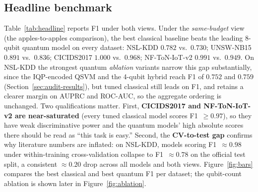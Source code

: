 \documentclass[preprint,11pt]{elsarticle}
\begin{document}
\subsection{Headline benchmark}
Table~\ref{tab:headline} reports F1 under both views. Under the \emph{same-budget} view (the
apples-to-apples comparison), the best classical baseline beats the leading 8-qubit quantum model on
every dataset: NSL-KDD $0.782$ vs.\ $0.730$; UNSW-NB15 $0.891$ vs.\ $0.836$; CICIDS2017 $1.000$ vs.\
$0.968$; NF-ToN-IoT-v2 $0.991$ vs.\ $0.949$. On NSL-KDD the strongest quantum \emph{ablation} variants
narrow this gap substantially, since the IQP-encoded QSVM and the 4-qubit hybrid reach F1 of $0.752$ and
$0.759$ (Section~\ref{sec:audit-results}), but tuned classical still leads on F1, and retains a clearer
margin on AUPRC and ROC-AUC, so the aggregate ordering is unchanged. Two qualifications
matter. First, \textbf{CICIDS2017 and NF-ToN-IoT-v2 are near-saturated} (every tuned classical model
scores F1~$\geq 0.97$), so they have weak discriminative power and the quantum models' high absolute
scores there should be read as ``this task is easy.'' Second, the \textbf{CV-to-test gap} confirms why
literature numbers are inflated: on NSL-KDD, models scoring F1~$\approx 0.98$ under within-training
cross-validation collapse to F1~$\approx 0.78$ on the official test split, a consistent $\approx 0.20$
drop across all models and both views. Figure~\ref{fig:bars} compares the best classical and best
quantum F1 per dataset; the qubit-count ablation is shown later in Figure~\ref{fig:ablation}.
\end{document}
